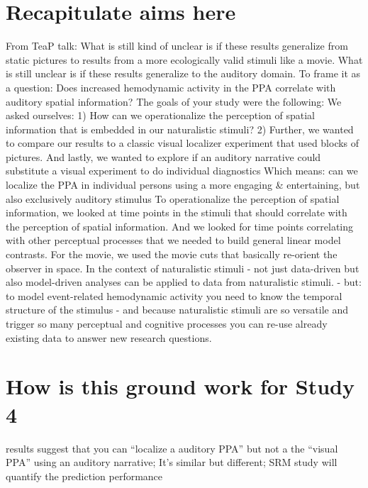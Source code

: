 
\section{Recapitulate aims here}

From TeaP talk:
%
What is still kind of unclear is if these results generalize from static
pictures to results from a more ecologically valid stimuli like a movie.
%
What is still unclear is if these results generalize to the auditory domain.  To
frame it as a question: Does increased hemodynamic activity in the PPA correlate
with auditory spatial information?
%
The goals of your study were the following: We asked ourselves:
%
1) How can we operationalize the perception of spatial information that is
embedded in our naturalistic stimuli?
%
2) Further, we wanted to compare our results to a classic visual localizer
experiment that used blocks of pictures.
%
And lastly, we wanted to explore if an auditory narrative could substitute a
visual experiment to do individual diagnostics
%
Which means: can we localize the PPA in individual persons using a more engaging
\& entertaining, but also exclusively auditory stimulus
%
To operationalize the perception of spatial information, we looked at time
points in the stimuli that should correlate with the perception of spatial
information.
%
And we looked for time points correlating with other perceptual processes that
we needed to build general linear model contrasts.
%
For the movie, we used the movie cuts that basically re-orient the observer in
space.
%
In the context of naturalistic stimuli - not just data-driven but also
model-driven analyses can be applied to data from naturalistic stimuli.
%
- but: to model event-related hemodynamic activity you need to know the temporal
structure of the stimulus
%
- and because naturalistic stimuli are so versatile and trigger so many
perceptual and cognitive processes you can re-use already existing data to
answer new research questions.

\section{How is this ground work for Study 4}
%
results suggest that you can ``localize a auditory PPA'' but not a the ``visual
PPA'' using an auditory narrative; It's similar but different; SRM study will
quantify the prediction performance

